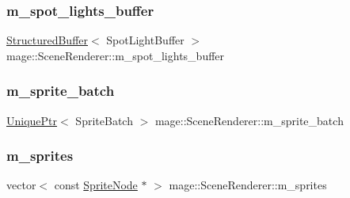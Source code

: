 \hypertarget{classmage_1_1_scene_renderer_a7ca000ba02f8ee7260239f4aec931fed}{}\label{classmage_1_1_scene_renderer_a7ca000ba02f8ee7260239f4aec931fed} 
\subsubsection{\texorpdfstring{m\+\_\+spot\+\_\+lights\+\_\+buffer}{m\_spot\_lights\_buffer}}
{\footnotesize\ttfamily \hyperlink{structmage_1_1_structured_buffer}{Structured\+Buffer}$<$ Spot\+Light\+Buffer $>$ mage\+::\+Scene\+Renderer\+::m\+\_\+spot\+\_\+lights\+\_\+buffer\hspace{0.3cm}{\ttfamily [private]}}

\hypertarget{classmage_1_1_scene_renderer_ac0ce4e836c117307c655eb5634e88f5c}{}\label{classmage_1_1_scene_renderer_ac0ce4e836c117307c655eb5634e88f5c} 
\subsubsection{\texorpdfstring{m\+\_\+sprite\+\_\+batch}{m\_sprite\_batch}}
{\footnotesize\ttfamily \hyperlink{namespacemage_a3316d7143a973e37adf1110f2e80ca31}{Unique\+Ptr}$<$ Sprite\+Batch $>$ mage\+::\+Scene\+Renderer\+::m\+\_\+sprite\+\_\+batch\hspace{0.3cm}{\ttfamily [private]}}

\hypertarget{classmage_1_1_scene_renderer_a6953113e6196498460eafceab6f00f35}{}\label{classmage_1_1_scene_renderer_a6953113e6196498460eafceab6f00f35} 
\subsubsection{\texorpdfstring{m\+\_\+sprites}{m\_sprites}}
{\footnotesize\ttfamily vector$<$ const \hyperlink{classmage_1_1_sprite_node}{Sprite\+Node} $\ast$ $>$ mage\+::\+Scene\+Renderer\+::m\+\_\+sprites\hspace{0.3cm}{\ttfamily [private]}}

